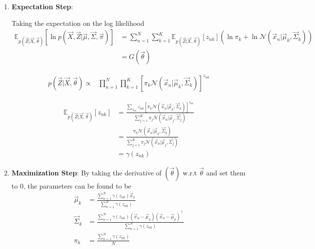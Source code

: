 \documentclass[12pt,twoside]{article}
\begin{document}
\begin{enumerate}
\item \textbf{Expectation Step}:

Taking the expectation on the log likelihood 
\begin{align*}
\mathbb{E}_{p(\vec{Z}\vert \vec{X}, \vec{\theta})}\left[\ln p(\vec{X}, \vec{Z}\vert \vec{\mu}, \vec{\Sigma}, \vec{\pi})\right]
& =\sum_{n=1}^{N}\sum_{k=1}^{K} \mathbb{E}_{p(\vec{Z}\vert \vec{X}, \vec{\theta})}[z_{nk}]\left(\ln \pi_k + \ln \mathcal{N}(\vec{x}_n\vert \vec{\mu}_k, \vec{\Sigma}_k)\right)\\
& = G(\vec{\theta})
\end{align*}

\begin{align*}
p(\vec{Z}\vert \vec{X}, \vec{\theta})\propto &
\prod_{n=1}^N\prod_{k=1}^K [\pi_k\mathcal{N}(\vec{x}_n\vert \vec{\mu}_k, \vec{\Sigma}_k)]^{z_{nk}}
\end{align*}

\begin{align*}
\mathbb{E}_{p(\vec{Z}\vert \vec{X}, \vec{\theta})}[z_{nk}]
&= \frac{\sum_{z_{nk}}z_{nk}[\pi_k\mathcal{N}(\vec{x}_n\vert \vec{\mu}_k, \vec{\Sigma}_k)]^{z_{nk}} }{\sum_{j=1}^K \pi_j \mathcal{N}(\vec{x}_n \vert \vec{\mu}_j, \vec{\Sigma}_j)}\\
&= \frac{\pi_k \mathcal{N}(\vec{x}_n \vert \vec{\mu}_k, \vec{\Sigma}_k)}{\sum_{j=1}^K \pi_j \mathcal{N}(\vec{x}_n \vert \vec{\mu}_j, \vec{\Sigma}_j)}\\
&=\gamma({z_{nk}})
\end{align*}

\item \textbf{Maximization Step}:
By taking the derivative of $(\vec{\theta})$ w.r.t $\vec{\theta}$ and set them to $0$, the parameters can be found to be
\begin{align*}
\vec{\mu}_k & = \frac{\sum_{n=1}^N \gamma(z_{nk})\vec{x}_n}{\sum_{n=1}^N \gamma(z_{nk})}\\
\vec{\Sigma}_k& = \frac{\sum_{n=1}^N \gamma(z_{nk})(\vec{x}_n-\vec{\mu}_k)(\vec{x}_n-\vec{\mu}_k)^\top}{\sum_{n=1}^N \gamma(z_{nk})}\\
\pi_k&= \frac{\sum_{n=1}^N \gamma(z_{nk})}{N}
\end{align*}

\end{enumerate}
\end{document}
